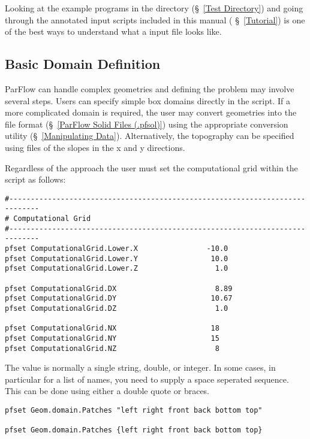 Looking at the example programs in the  directory (\S~\ref{Test Directory}) and 
going through the annotated input scripts included in this manual ( \S~\ref{Tutorial}) is 
one of the best ways to understand what a \parflow{} input file looks like. 

\subsection{Basic Domain Definition}
\label{Defining a domain}

ParFlow can handle complex geometries and defining the problem may involve several steps.
Users can specify simple box domains directly in the  script. If a more complicated
domain is required, the user may convert geometries into the  file format 
(\S~\ref{ParFlow Solid Files (.pfsol)}) using the appropriate \pftools{} conversion utility 
(\S~\ref{Manipulating Data}).  Alternatively, the topography can be specified using 
 files of the slopes in the x and y directions.

Regardless of the approach the user must set the computational grid within the  
script as follows:

\begin{display}\begin{verbatim}
#-----------------------------------------------------------------------------
# Computational Grid
#-----------------------------------------------------------------------------
pfset ComputationalGrid.Lower.X                -10.0
pfset ComputationalGrid.Lower.Y                 10.0
pfset ComputationalGrid.Lower.Z                  1.0
 
pfset ComputationalGrid.DX                       8.89
pfset ComputationalGrid.DY                      10.67
pfset ComputationalGrid.DZ                       1.0
 
pfset ComputationalGrid.NX                      18
pfset ComputationalGrid.NY                      15
pfset ComputationalGrid.NZ                       8

\end{verbatim}\end{display}

The value is normally a single string, double, or integer.  In some cases,
in particular for a list of names, you need to supply a space seperated
sequence.  This can be done using either a double quote or braces.

\begin{display}\begin{verbatim}
pfset Geom.domain.Patches "left right front back bottom top"

pfset Geom.domain.Patches {left right front back bottom top}
\end{verbatim}\end{display}

